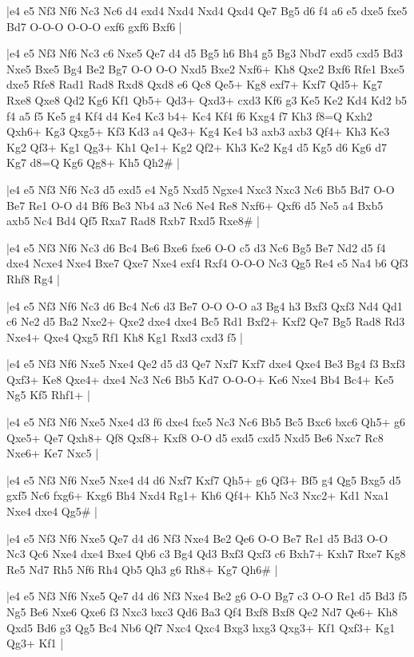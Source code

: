 \whitename{}
\blackname{}
\makegametitle
|e4 e5 Nf3 Nf6 Nc3 Nc6 d4 exd4 Nxd4 Nxd4 Qxd4 Qe7 Bg5 d6 f4 a6 e5 dxe5 fxe5 Bd7 O-O-O O-O-O exf6 gxf6 Bxf6  |

\whitename{}
\blackname{}
\makegametitle
|e4 e5 Nf3 Nf6 Nc3 c6 Nxe5 Qe7 d4 d5 Bg5 h6 Bh4 g5 Bg3 Nbd7 exd5 cxd5 Bd3 Nxe5 Bxe5 Bg4 Be2 Bg7 O-O O-O Nxd5 Bxe2 Nxf6+ Kh8 Qxe2 Bxf6 Rfe1 Bxe5 dxe5 Rfe8 Rad1 Rad8 Rxd8 Qxd8 e6 Qc8 Qe5+ Kg8 exf7+ Kxf7 Qd5+ Kg7 Rxe8 Qxe8 Qd2 Kg6 Kf1 Qb5+ Qd3+ Qxd3+ cxd3 Kf6 g3 Ke5 Ke2 Kd4 Kd2 b5 f4 a5 f5 Ke5 g4 Kf4 d4 Ke4 Kc3 b4+ Kc4 Kf4 f6 Kxg4 f7 Kh3 f8=Q Kxh2 Qxh6+ Kg3 Qxg5+ Kf3 Kd3 a4 Qe3+ Kg4 Ke4 b3 axb3 axb3 Qf4+ Kh3 Ke3 Kg2 Qf3+ Kg1 Qg3+ Kh1 Qe1+ Kg2 Qf2+ Kh3 Ke2 Kg4 d5 Kg5 d6 Kg6 d7 Kg7 d8=Q Kg6 Qg8+ Kh5 Qh2\#  |

\whitename{}
\blackname{}
\makegametitle
|e4 e5 Nf3 Nf6 Nc3 d5 exd5 e4 Ng5 Nxd5 Ngxe4 Nxc3 Nxc3 Nc6 Bb5 Bd7 O-O Be7 Re1 O-O d4 Bf6 Be3 Nb4 a3 Nc6 Ne4 Re8 Nxf6+ Qxf6 d5 Ne5 a4 Bxb5 axb5 Nc4 Bd4 Qf5 Rxa7 Rad8 Rxb7 Rxd5 Rxe8\#  |

\whitename{}
\blackname{}
\makegametitle
|e4 e5 Nf3 Nf6 Nc3 d6 Bc4 Be6 Bxe6 fxe6 O-O c5 d3 Nc6 Bg5 Be7 Nd2 d5 f4 dxe4 Ncxe4 Nxe4 Bxe7 Qxe7 Nxe4 exf4 Rxf4 O-O-O Nc3 Qg5 Re4 e5 Na4 b6 Qf3 Rhf8 Rg4  |

\whitename{}
\blackname{}
\makegametitle
|e4 e5 Nf3 Nf6 Nc3 d6 Bc4 Nc6 d3 Be7 O-O O-O a3 Bg4 h3 Bxf3 Qxf3 Nd4 Qd1 c6 Ne2 d5 Ba2 Nxe2+ Qxe2 dxe4 dxe4 Bc5 Rd1 Bxf2+ Kxf2 Qe7 Bg5 Rad8 Rd3 Nxe4+ Qxe4 Qxg5 Rf1 Kh8 Kg1 Rxd3 cxd3 f5  |

\whitename{}
\blackname{}
\makegametitle
|e4 e5 Nf3 Nf6 Nxe5 Nxe4 Qe2 d5 d3 Qe7 Nxf7 Kxf7 dxe4 Qxe4 Be3 Bg4 f3 Bxf3 Qxf3+ Ke8 Qxe4+ dxe4 Nc3 Nc6 Bb5 Kd7 O-O-O+ Ke6 Nxe4 Bb4 Bc4+ Ke5 Ng5 Kf5 Rhf1+  |

\whitename{}
\blackname{}
\makegametitle
|e4 e5 Nf3 Nf6 Nxe5 Nxe4 d3 f6 dxe4 fxe5 Nc3 Nc6 Bb5 Bc5 Bxc6 bxc6 Qh5+ g6 Qxe5+ Qe7 Qxh8+ Qf8 Qxf8+ Kxf8 O-O d5 exd5 cxd5 Nxd5 Be6 Nxc7 Rc8 Nxe6+ Ke7 Nxc5  |

\whitename{}
\blackname{}
\makegametitle
|e4 e5 Nf3 Nf6 Nxe5 Nxe4 d4 d6 Nxf7 Kxf7 Qh5+ g6 Qf3+ Bf5 g4 Qg5 Bxg5 d5 gxf5 Nc6 fxg6+ Kxg6 Bh4 Nxd4 Rg1+ Kh6 Qf4+ Kh5 Nc3 Nxc2+ Kd1 Nxa1 Nxe4 dxe4 Qg5\#  |

\whitename{}
\blackname{}
\makegametitle
|e4 e5 Nf3 Nf6 Nxe5 Qe7 d4 d6 Nf3 Nxe4 Be2 Qe6 O-O Be7 Re1 d5 Bd3 O-O Nc3 Qc6 Nxe4 dxe4 Bxe4 Qb6 c3 Bg4 Qd3 Bxf3 Qxf3 c6 Bxh7+ Kxh7 Rxe7 Kg8 Re5 Nd7 Rh5 Nf6 Rh4 Qb5 Qh3 g6 Rh8+ Kg7 Qh6\#  |

\whitename{}
\blackname{}
\makegametitle
|e4 e5 Nf3 Nf6 Nxe5 Qe7 d4 d6 Nf3 Nxe4 Be2 g6 O-O Bg7 c3 O-O Re1 d5 Bd3 f5 Ng5 Be6 Nxe6 Qxe6 f3 Nxc3 bxc3 Qd6 Ba3 Qf4 Bxf8 Bxf8 Qe2 Nd7 Qe6+ Kh8 Qxd5 Bd6 g3 Qg5 Bc4 Nb6 Qf7 Nxc4 Qxc4 Bxg3 hxg3 Qxg3+ Kf1 Qxf3+ Kg1 Qg3+ Kf1  |

